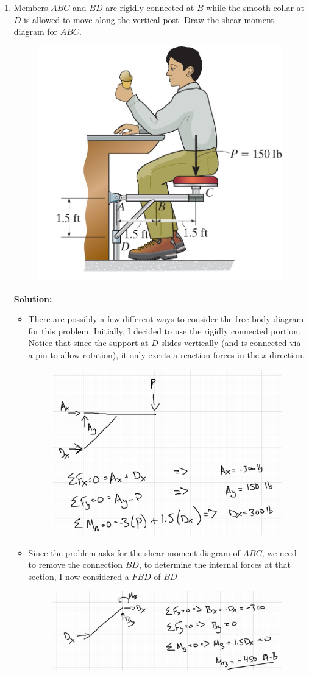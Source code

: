 \documentclass[12pt, oneside]{article}
\begin{document}
\begin{enumerate}
	\item %
		Members $ABC$ and $BD$ are rigidly connected at $B$ while the smooth collar at $D$ is allowed to move along the vertical post.
		Draw the shear-moment diagram for $ABC$.
		\begin{figure}[H]
			\centering
			\includegraphics[width=0.3\linewidth]{6-15}
		\end{figure}
			\textbf{Solution:}
			\begin{itemize}
				\item There are possibly a few different ways to consider the free body diagram for this problem.
					Initially, I decided to use the rigidly connected portion.
					Notice that since the support at $D$ slides vertically (and is connected via a pin to allow rotation), it only exerts a reaction forces in the $x$ direction.
					\begin{figure}[H]
						\centering
						\includegraphics[width=0.6\linewidth]{5-3a}
					\end{figure}
				\item Since the problem asks for the shear-moment diagram of $ABC$, we need to remove the connection $BD$, to determine the internal forces at that section, I now considered a $FBD$ of $BD$
					\begin{figure}[H]
						\centering
						\includegraphics[width=0.6\linewidth]{5-3b}

\end{figure}
\end{itemize}
\end{enumerate}
\end{document}
